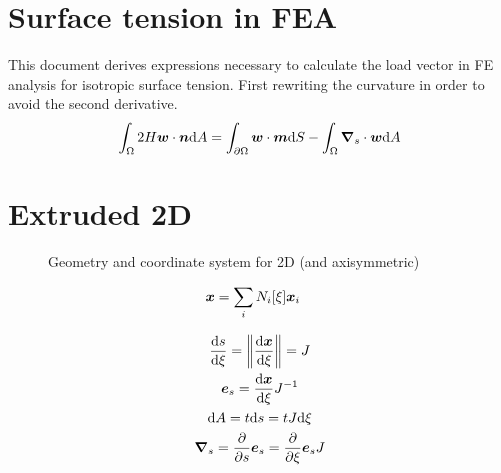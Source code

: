 \documentclass[a4paper,11pt]{article}
\renewcommand{\to}[1]{\text{\boldmath $#1$}} %
\newcommand{\intd}[1]{\mathrm{d}#1}
\newcommand{\pderiv}[2]{\frac{\partial#1}{\partial#2}}
\newcommand{\dderiv}[2]{\frac{\mathrm{d}#1}{\mathrm{d}#2}}
\newcommand{\norm}[1]{\left\lVert{#1}\right\rVert}
\begin{document}
\section{Surface tension in FEA}
This document derives expressions necessary to calculate the load vector in FE analysis for isotropic surface tension. First rewriting the curvature in order to avoid the second derivative.
\begin{align}
 \int_\Omega 2 H \to w\cdot \to n\intd A = \int_{\partial\Omega} \to w\cdot\to m\intd S - \int_\Omega \to \nabla_s \cdot \to w \intd A
\end{align}

\section{Extruded 2D}

\begin{figure}[htpb]
 \centering
 \caption{Geometry and coordinate system for 2D (and axisymmetric)}
\end{figure}

\begin{align}
 \to x &= \sum_i N_i[\xi]\to x_i
\end{align}

\begin{gather}
 \dderiv{s}{\xi} = \norm{\dderiv{\to x}{\xi}} = J\\
 \to e_s = \dderiv{\to x}{\xi} J^{-1}\\
 \intd A = t \intd s = t J \intd \xi\\
 \to \nabla_s = \pderiv{}{s}\to e_s = \pderiv{}{\xi}\to e_s J
\end{gather}
\end{document}

